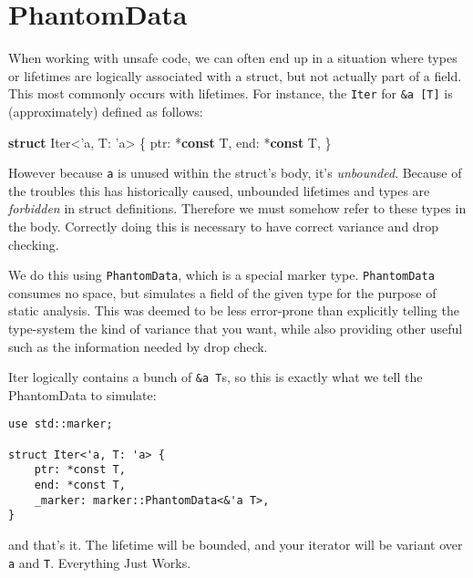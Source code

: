 \documentclass[a4paper,]{book}
\newenvironment{Shaded}{\begin{snugshade}}{\end{snugshade}}
\newcommand{\KeywordTok}[1]{\textcolor[rgb]{0.13,0.29,0.53}{\textbf{{#1}}}}
\newcommand{\OtherTok}[1]{\textcolor[rgb]{0.56,0.35,0.01}{{#1}}}
\newcommand{\NormalTok}[1]{{#1}}
\begin{document}
\section{PhantomData}\label{sec--phantom-data}

When working with unsafe code, we can often end up in a situation where
types or lifetimes are logically associated with a struct, but not
actually part of a field. This most commonly occurs with lifetimes. For
instance, the \texttt{Iter} for \texttt{\&\textquotesingle{}a\ {[}T{]}}
is (approximately) defined as follows:

\begin{Shaded}
\begin{Highlighting}[]
\KeywordTok{struct} \NormalTok{Iter<}\OtherTok{'a}\NormalTok{, T: }\OtherTok{'a}\NormalTok{> \{}
    \NormalTok{ptr: *}\KeywordTok{const} \NormalTok{T,}
    \NormalTok{end: *}\KeywordTok{const} \NormalTok{T,}
\NormalTok{\}}
\end{Highlighting}
\end{Shaded}

However because \texttt{\textquotesingle{}a} is unused within the
struct's body, it's \emph{unbounded}. Because of the troubles this has
historically caused, unbounded lifetimes and types are \emph{forbidden}
in struct definitions. Therefore we must somehow refer to these types in
the body. Correctly doing this is necessary to have correct variance and
drop checking.

We do this using \texttt{PhantomData}, which is a special marker type.
\texttt{PhantomData} consumes no space, but simulates a field of the
given type for the purpose of static analysis. This was deemed to be
less error-prone than explicitly telling the type-system the kind of
variance that you want, while also providing other useful such as the
information needed by drop check.

Iter logically contains a bunch of \texttt{\&\textquotesingle{}a\ T}s,
so this is exactly what we tell the PhantomData to simulate:

\begin{verbatim}
use std::marker;

struct Iter<'a, T: 'a> {
    ptr: *const T,
    end: *const T,
    _marker: marker::PhantomData<&'a T>,
}
\end{verbatim}

and that's it. The lifetime will be bounded, and your iterator will be
variant over \texttt{\textquotesingle{}a} and \texttt{T}. Everything
Just Works.
\end{document}

